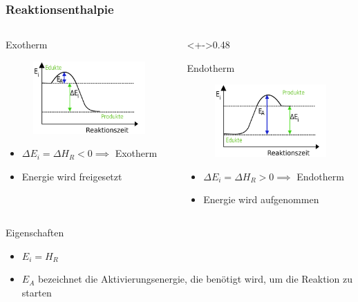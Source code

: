 \begin{frame}
	\frametitle{Reaktionsenthalpie}
	\begin{columns}
	\begin{column}{0.48\textwidth}
	\begin{block}{Exotherm}
	\begin{figure}[H]
		\includegraphics[width=0.6\columnwidth]{../exotherm_enthalpie.png}
	\end{figure}
	\begin{itemize}
		\item<+-> $\Delta E_i = \Delta H_R < 0 \implies$ Exotherm
		\item<+-> Energie wird freigesetzt
	\end{itemize}
	\end{block}
	\end{column}
	\begin{column}<+->{0.48\textwidth}
	\begin{block}{Endotherm}
	\begin{figure}[H]
		\includegraphics[width=0.6\columnwidth]{../endotherm_enthalpie.png}
	\end{figure}
	\begin{itemize}
		\item<+-> $\Delta E_i = \Delta H_R > 0 \implies$ Endotherm
		\item<+-> Energie wird aufgenommen
	\end{itemize}
	\end{block}
	\end{column}
	\end{columns}
	\begin{block}{Eigenschaften}
	\begin{itemize}
		\item $E_i = H_R$
		\item<+-> $E_A$ bezeichnet die Aktivierungsenergie, die benötigt wird, um die Reaktion zu starten 
	\end{itemize}
	\end{block}
\end{frame}
